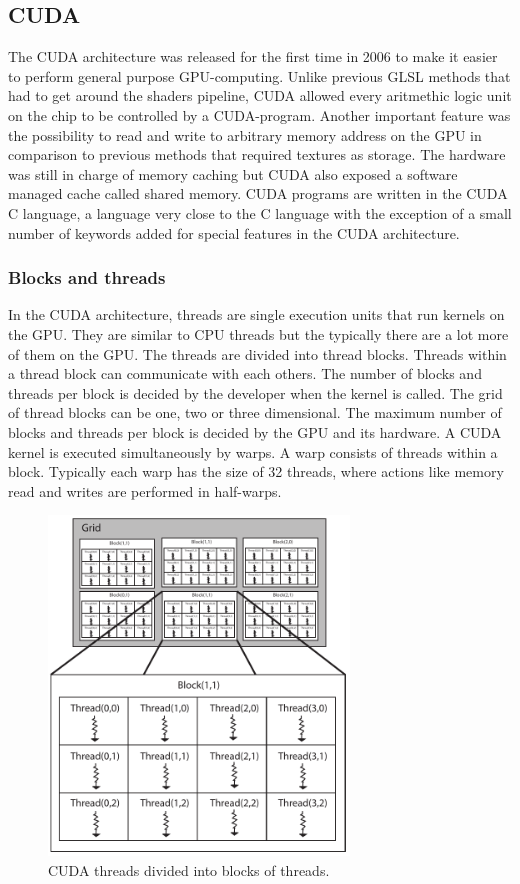 \newpage
\subsection{CUDA}

The CUDA architecture was released for the first time in 2006 to make it easier to perform general purpose GPU-computing. Unlike previous GLSL methods that had to get around the shaders pipeline, CUDA allowed every aritmethic logic unit on the chip to be controlled by a CUDA-program. Another important feature was the possibility to read and write to arbitrary memory address on the GPU in comparison to previous methods that required textures as storage. The hardware was still in charge of memory caching but CUDA also exposed a software managed cache called shared memory. CUDA programs are written in the CUDA C language, a language very close to the C language with the exception of a small number of keywords added for special features in the CUDA architecture.  

\subsubsection{Blocks and threads}

In the CUDA architecture, threads are single execution units that run kernels on the GPU. They are similar to CPU threads but the typically there are a lot more of them on the GPU. The threads are divided into thread blocks. Threads within a thread block can communicate with each others. The number of blocks and threads per block is decided by the developer when the kernel is called. The grid of thread blocks can be one, two or three dimensional. The maximum number of blocks and threads per block is decided by the GPU and its hardware. A CUDA kernel is executed simultaneously by warps. A warp consists of threads within a block. Typically each warp has the size of 32 threads, where actions like memory read and writes are performed in half-warps. 
\newline

\begin{figure}[ht!]
\centering
\includegraphics[width=80mm]{img/cuda.pdf}
\caption{CUDA threads divided into blocks of threads.}
\label{cudablockthreads}
\end{figure}

